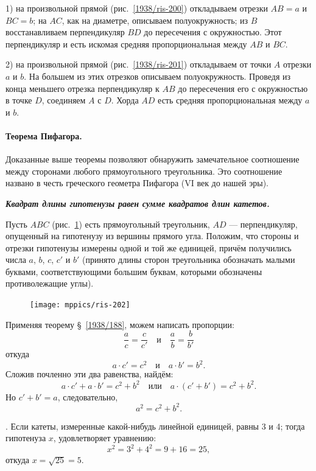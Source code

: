 \documentclass[twoside]{book}
\begin{document}
1) на произвольной прямой (рис.~\ref{1938/ris-200}) откладываем отрезки $AB=a$ и $BC=b$;
на $AC$, как на диаметре, описываем полуокружность;
из $B$ восстанавливаем перпендикуляр $BD$ до пересечения с окружностью.
Этот перпендикуляр и есть искомая средняя пропорциональная между $AB$ и $BC$.

2) на произвольной прямой (рис.~\ref{1938/ris-201}) откладываем от точки $A$ отрезки $a$ и $b$.
На большем из этих отрезков описываем полуокружность.
Проведя из конца меньшего отрезка перпендикуляр к $AB$ до пересечения его с окружностью в точке $D$, соединяем $A$ с $D$.
Хорда $AD$ есть средняя пропорциональная между $a$ и $b$.

\paragraph{Теорема Пифагора.}\label{1938/191}
Доказанные выше теоремы позволяют обнаружить замечательное соотношение между сторонами любого прямоугольного треугольника.
Это соотношение названо в честь греческого геометра Пифагора (VI век до нашей эры).

\textbf{\emph{Квадрат длины гипотенузы равен сумме квадратов длин катетов.}} 

Пусть $ABC$ (рис.~\ref{1938/ris-202}) есть прямоугольный треугольник, $AD$ — перпендикуляр, опущенный на гипотенузу из вершины прямого угла.
Положим, что стороны и отрезки гипотенузы измерены одной и той же единицей, причём получились числа $a$, $b$, $c$, $c'$ и $b'$ (принято длины сторон треугольника обозначать малыми буквами, соответствующими большим буквам, которыми обозначены противолежащие углы).

\begin{figure}
\centering
\texttt{[image: mppics/ris-202]}
\caption{}\label{1938/ris-202}
\end{figure}

Применяя теорему §~\ref{1938/188}, можем написать пропорции:
\[\frac ac=\frac c{c'}
\quad\text{и}\quad
\frac ab=\frac b{b'}\]
откуда 
\[a\cdot c'=c^2
\quad\text{и}\quad
a\cdot b'=b^2.\]
Сложив почленно эти два равенства, найдём:
\[a\cdot c'+a\cdot b'=c^2+b^2
\quad\text{или}\quad
a\cdot (c'+b')=c^2+b^2.\]
Но $c'+b'=a$, следовательно,
\[a^2=c^2+b^2.\]

\smallskip
{}.
Если катеты, измеренные какой-нибудь линейной единицей, равны 3 и 4; 
тогда гипотенуза  $x$, удовлетворяет уравнению:
\[x^2=3^2+4^2=9+16=25,\]
откуда $x = \sqrt{25} = 5$.
\end{document}
